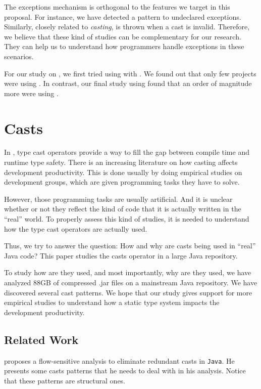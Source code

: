 \documentclass{usiinfdocprop}
\begin{document}
The exceptions mechanism is orthogonal to the features we target in this proposal.
For instance, we have detected a \smu{} pattern to \throw{} undeclared exceptions.
Similarly, closely related to \emph{casting}, \cce{} is thrown when a cast is invalid.
Therefore, we believe that these kind of studies can be complementary for our research.
They can help us to understand how programmers handle exceptions in these scenarios.

For our study on \smu{}, we first tried using \boa{} with \sourceforge{}.
We found out that only few projects were using \smu{}.
In contrast, our final study using \maven{} found that an order of magnitude more were using \smu{}.

\section{Casts \label{org6b1a6b6}}
\label{sec:orgbd801ef}

In \java, type cast operators provide a way to fill the gap between compile time and runtime type safety.
There is an increasing literature on how casting affects development productivity.
This is done usually by doing empirical studies on development groups, which are given programming tasks they have to solve.

However, those programming tasks are usually artificial.
And it is unclear whether or not they reflect the kind of code that it is actually written in the ``real'' world.
To properly assess this kind of studies, it is needed to understand how the type cast operators are actually used.

Thus, we try to answer the question: How and why are casts being used in ``real'' Java code?
This paper studies the casts operator in a large Java repository.

To study how are they used, and most importantly, why are they used, we have analyzed 88GB of compressed .jar files on a mainstream Java repository.
We have discovered several cast patterns.
We hope that our study gives support for more empirical studies to understand how a static type system impacts the development productivity.

\subsection{Related Work}
\label{sec:org8aa9ad0}
\cite{winther_guarded_2011} proposes a flow-sensitive analysis to eliminate
redundant casts in \texttt{Java}.
He presents some casts patterns that he needs to deal with in his analysis.
Notice that these patterns are structural ones.
\end{document}
